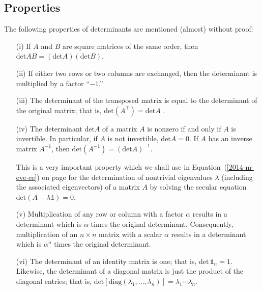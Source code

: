 \subsection{Properties}

The following properties of determinants are mentioned (almost) without proof:

\begin{itemize}
\item[(i)]
If $A$ and $B$ are square matrices of the same order, then
$\textrm{det}AB = (\textrm{det}A)  (\textrm{det}B)$.

\item[(ii)]
If either two rows or two columns are exchanged, then the determinant is multiplied
by a factor ``$-1$.''


\item[(iii)]
The determinant of the transposed matrix is equal to the determinant of the original matrix; that is,
$\textrm{det}(A^\intercal ) = \textrm{det}A $ .

\item[(iv)]
The determinant $\textrm{det}A $ of a matrix $A$ is nonzero if and only if $A$ is invertible.
In particular, if $A$ is not invertible, $\textrm{det}A =0$.
If $A$ has an inverse matrix $A^{-1}$, then $\textrm{det}(A^{-1}) = (\textrm{det}A)^{-1} $.

This is a very important property which we shall use in Equation~(\ref{2014-m-eve-ce}) on page \pageref{2014-m-eve-ce}
for the determination of nontrivial
eigenvalues $\lambda$ (including the associated eigenvectors)
of a matrix $A$ by solving the secular equation $\textrm{det} (A-\lambda \mathbb{1})=0 $.



\item[(v)]
Multiplication of any row or column with a factor $\alpha$  results in a determinant
which is $\alpha$ times the original determinant.
Consequently,
multiplication of an $n \times n$ matrix with a scalar $\alpha$ results
in a   determinant
which is $\alpha^n$ times the original determinant.

\item[(vi)]
The determinant of an identity matrix is one; that is,
$\textrm{det} \, \mathbb{1}_n =1$.
Likewise, the determinant of a diagonal matrix is just the product of the diagonal entries;
that is,
$\textrm{det} [\textrm{diag}(\lambda_1,\ldots, \lambda_n)] = \lambda_1 \cdots \lambda_n$.


\end{itemize}
